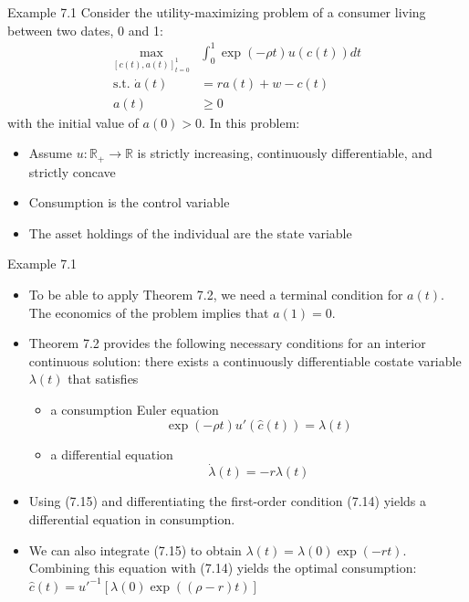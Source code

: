 \documentclass[9pt,aspectratio=169]{beamer}
\begin{document}
\begin{frame}{Example 7.1}
    Consider the utility-maximizing problem of a consumer living between two
    dates, 0 and 1:
    \begin{align*}
        \max_{[c(t),a(t)]_{t=0}^1} &\int_0^1 \exp(-\rho t)u(c(t))dt\\
        \text{s.t. } \dot{a}(t) &= ra(t) + w - c(t)\\
        a(t) &\geq 0
    \end{align*}
    with the initial value of $a(0) > 0$. In this problem:
    \begin{itemize}
        \item Assume $u : \mathbb{R}_+ \rightarrow \mathbb{R}$ is strictly
        increasing, continuously differentiable, and strictly concave
        \item Consumption is the control variable
        \item The asset holdings of the individual are the state variable
    \end{itemize}
\end{frame}

\begin{frame}{Example 7.1}
\begin{itemize}
    \item To be able to apply Theorem 7.2, we need a terminal condition for
    $a(t)$. The economics of the problem implies that $a(1) = 0$.
    \item Theorem 7.2 provides the following necessary conditions for an
    interior continuous solution: there exists a continuously differentiable
    costate variable $\lambda(t)$ that satisfies
    \begin{itemize}
        \item a consumption Euler equation
        \begin{equation}
            \exp(-\rho t)u'(\hat{c}(t)) = \lambda(t)\tag{7.14}            
        \end{equation}
        \item a differential equation
        \begin{equation}
            \dot{\lambda}(t) = -r\lambda(t) \tag{7.15}
        \end{equation}
    \end{itemize}
    \item Using (7.15) and differentiating the first-order condition (7.14)
    yields a differential equation in consumption.
    \item We can also integrate (7.15) to obtain $\lambda(t) = \lambda(0)
    \exp(-rt)$. Combining this equation with (7.14) yields the optimal
    consumption: $\hat{c}(t) = u'^{-1}[\lambda(0) \exp((\rho - r)t)]$
\end{itemize}
\end{frame}
\end{document}
